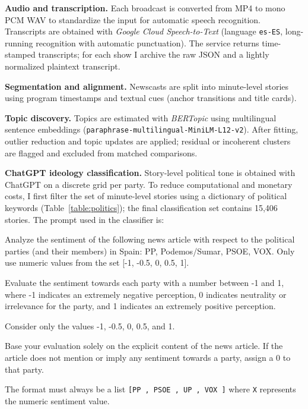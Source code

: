\documentclass[12pt]{article}
\begin{document}
\textbf{Audio and transcription.} Each broadcast is converted from MP4 to mono PCM WAV to standardize the input for automatic speech recognition. Transcripts are obtained with \emph{Google Cloud Speech-to-Text} (language \texttt{es-ES}, long-running recognition with automatic punctuation). The service returns time-stamped transcripts; for each show I archive the raw JSON and a lightly normalized plaintext transcript.

\textbf{Segmentation and alignment.} Newscasts are split into minute-level stories using program timestamps and textual cues (anchor transitions and title cards). 

\textbf{Topic discovery.} Topics are estimated with \emph{BERTopic} using multilingual sentence embeddings (\texttt{paraphrase-multilingual-MiniLM-L12-v2}). After fitting, outlier reduction and topic updates are applied; residual or incoherent clusters are flagged and excluded from matched comparisons.

\textbf{ChatGPT ideology classification.} Story-level political tone is obtained with ChatGPT on a discrete grid per party. To reduce computational and monetary costs, I first filter the set of minute-level stories using a dictionary of political keywords (Table~\ref{table:politics}); the final classification set contains 15{,}406 stories. The prompt used in the classifier is:

\begin{tcolorbox}[colback=blue!5!white, colframe=blue!75!black, title=Prompt]
	Analyze the sentiment of the following news article with respect to the political parties (and their members) in Spain: PP, Podemos/Sumar, PSOE, VOX. Only use numeric values from the set [-1, -0.5, 0, 0.5, 1].
	
	Evaluate the sentiment towards each party with a number between -1 and 1, where -1 indicates an extremely negative perception, 0 indicates neutrality or irrelevance for the party, and 1 indicates an extremely positive perception.
	
	Consider only the values -1, -0.5, 0, 0.5, and 1.
	
	Base your evaluation solely on the explicit content of the news article. If the article does not mention or imply any sentiment towards a party, assign a 0 to that party.
	
	The format must always be a list \texttt{[PP
		, PSOE
		, UP
		, VOX
		]} where \texttt{X} represents the numeric sentiment value.
\end{tcolorbox}
\end{document}

